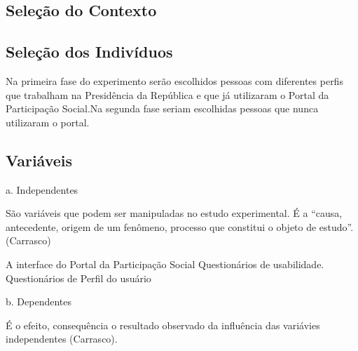 
\subsection{Seleção do Contexto}

\subsection{Seleção dos Indivíduos}

	Na primeira fase do experimento serão escolhidos pessoas com diferentes perfis que trabalham na Presidência da República e que já utilizaram o Portal da Participação Social.Na segunda fase seriam escolhidas pessoas que nunca utilizaram o portal.

\subsection{Variáveis}
 
a. Independentes

São variáveis que podem ser manipuladas no estudo experimental. É a “causa, antecedente, origem de um fenômeno, processo que constitui o objeto de estudo”.(Carrasco)


A interface do Portal da Participação Social
Questionários de usabilidade.
Questionários de Perfil do usuário


b. Dependentes

É o efeito, consequência o resultado observado da influência das variávies independentes (Carrasco).


